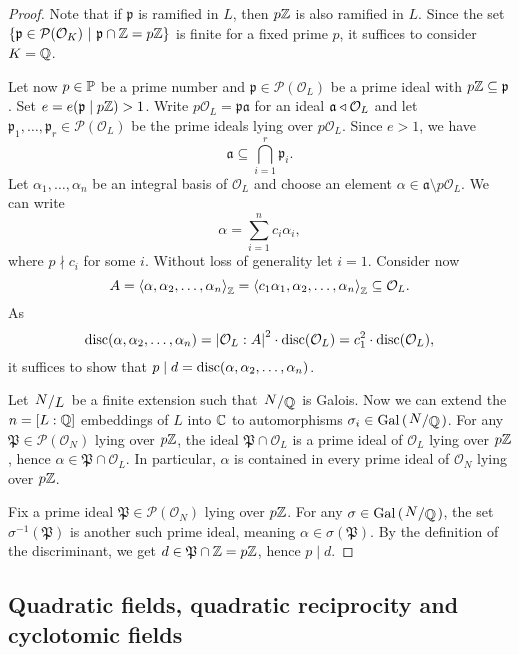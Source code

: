 \begin{proof}
Note that if $\mathfrak{p}$ is ramified in $L$, then $p\Z$ is also
ramified in $L$. Since the set
$\setb{\mathfrak{p} \in \mathcal{P}(\mathcal{O}_K)}
{\mathfrak{p} \cap \Z = p\Z}$
is finite for a fixed prime $p$, it suffices to consider $K = \Q$.

Let now $p \in \P$ be a prime number and
$\mathfrak{p} \in \mathcal{P}(\mathcal{O}_L)$ be a prime ideal with
$p\Z \subseteq \mathfrak{p}$. Set
$e = e(\mathfrak{p} \mid p\Z) > 1$. Write
$p \mathcal{O}_L = \mathfrak{pa}$ for an ideal
$\mathfrak{a} \edn \mathcal{O}_L$ and let
$\mathfrak{p}_1, \dots, \mathfrak{p}_r \in
\mathcal{P}(\mathcal{O}_L)$ be the prime ideals lying over
$p \mathcal{O}_L$. Since $e>1$, we have
\[
\mathfrak{a} \subseteq \bigcap_{i=1}^r \mathfrak{p}_i.
\]
Let $\alpha_1, \dots, \alpha_n$ be an integral basis of
$\mathcal{O}_L$ and choose an element
$\alpha \in \mathfrak{a} \setminus p \mathcal{O}_L$. We can write
\[
\alpha = \sum_{i=1}^n c_i \alpha_i,
\]
where $p \nmid c_i$ for some $i$. Without loss of generality let
$i = 1$. Consider now
\[
A =
\skl{\alpha, \alpha_2, \dots, \alpha_n}_\Z =
\skl{c_1 \alpha_1, \alpha_2, \dots, \alpha_n}_\Z \subseteq
\mathcal{O}_L.
\]
As
\[
\disc(\alpha, \alpha_2, \dots, \alpha_n) =
\abs{\mathcal{O}_L : A}^2 \cdot \disc(\mathcal{O}_L) =
c_1^2 \cdot \disc(\mathcal{O}_L),
\]
it suffices to show that
$p \mid d = \disc(\alpha, \alpha_2, \dots, \alpha_n)$.

Let $\kvoc{N}{L}$ be a finite extension such that $\kvoc{N}{\Q}$ is
Galois. Now we can extend the $n = [L : \Q]$ embeddings of $L$ into
$\C$ to automorphisms $\sigma_i \in \Gal \br{\kvoc{N}{\Q}}$. For
any $\mathfrak{P} \in \mathcal{P}(\mathcal{O}_N)$ lying over $p\Z$,
the ideal $\mathfrak{P} \cap \mathcal{O}_L$ is a prime ideal of
$\mathcal{O}_L$ lying over $p\Z$, hence
$\alpha \in \mathfrak{P} \cap \mathcal{O}_L$. In particular,
$\alpha$ is contained in every prime ideal of $\mathcal{O}_N$ lying
over $p\Z$.

Fix a prime ideal $\mathfrak{P} \in \mathcal{P}(\mathcal{O}_N)$
lying over $p\Z$. For any $\sigma \in \Gal \br{\kvoc{N}{\Q}}$, the
set $\sigma^{-1}(\mathfrak{P})$ is another such prime ideal,
meaning $\alpha \in \sigma(\mathfrak{P})$. By the definition of the
discriminant, we get $d \in \mathfrak{P} \cap \Z = p\Z$, hence
$p \mid d$.
\end{proof}

\newpage

\subsection{Quadratic fields, quadratic reciprocity and cyclotomic fields}

